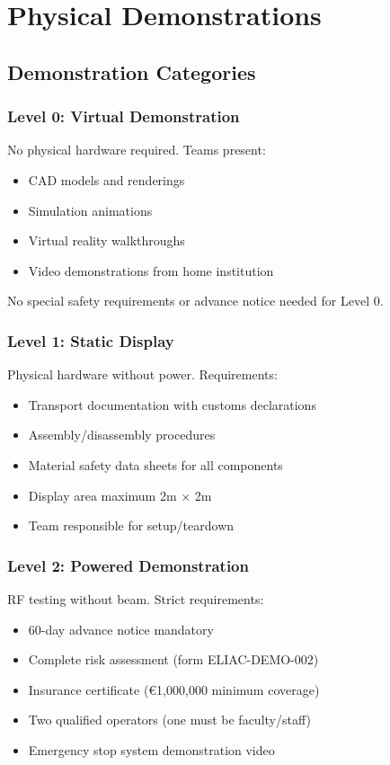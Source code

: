
\renewcommand{\thesection}{D}
\section{Physical Demonstrations}

\subsection{Demonstration Categories}

\subsubsection{Level 0: Virtual Demonstration}
No physical hardware required. Teams present:
\begin{itemize}[noitemsep]
    \item CAD models and renderings
    \item Simulation animations
    \item Virtual reality walkthroughs
    \item Video demonstrations from home institution
\end{itemize}

No special safety requirements or advance notice needed for Level 0.

\subsubsection{Level 1: Static Display}
Physical hardware without power. Requirements:
\begin{itemize}[noitemsep]
    \item Transport documentation with customs declarations
    \item Assembly/disassembly procedures
    \item Material safety data sheets for all components
    \item Display area maximum 2m × 2m
    \item Team responsible for setup/teardown
\end{itemize}

\subsubsection{Level 2: Powered Demonstration}
RF testing without beam. Strict requirements:
\begin{itemize}[noitemsep]
    \item 60-day advance notice mandatory
    \item Complete risk assessment (form ELIAC-DEMO-002)
    \item Insurance certificate (€1,000,000 minimum coverage)
    \item Two qualified operators (one must be faculty/staff)
    \item Emergency stop system demonstration video
\end{itemize}

